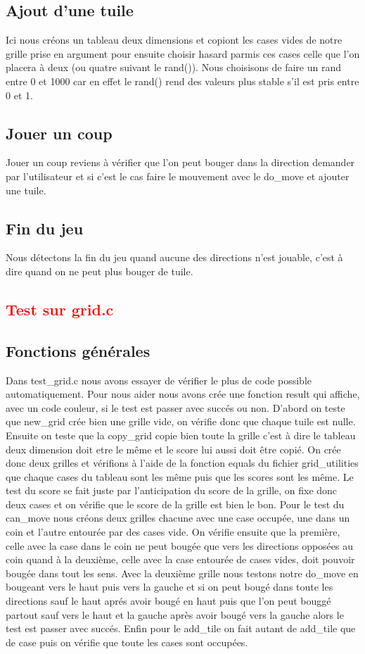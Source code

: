 \documentclass{article}
\begin{document}
\subsection{Ajout d'une tuile}
Ici nous créons un tableau deux dimensions et copiont les cases vides de notre grille prise en argument pour ensuite choisir hasard parmis ces cases celle que l'on placera à deux (ou quatre suivant le rand()). Nous choisisons de faire un rand entre 0 et 1000 car en effet le rand() rend des valeurs plus stable s'il est pris entre 0 et 1.
\subsection{Jouer un coup}
Jouer un coup reviens à vérifier que l'on peut bouger dans la direction demander par l'utilisateur et si c'est le cas faire le mouvement avec le do\_move et ajouter une tuile.
\subsection{Fin du jeu}
Nous détectons la fin du jeu quand aucune des directions n'est jouable, c'est à dire quand on ne peut plus bouger de tuile.
\textcolor{red}{\section{Test sur grid.c}}
\subsection{Fonctions générales}
Dans test\_grid.c nous avons essayer de vérifier le plus de code possible automatiquement.
Pour nous aider nous avons crée une fonction result qui affiche, avec un code couleur, si le test est passer avec succés ou non.
D'abord on teste que new\_grid crée bien une grille vide, on vérifie donc que chaque tuile est nulle.
Ensuite on teste que la copy\_grid copie bien toute la grille c'est à dire le tableau deux dimension doit etre le même et le score lui aussi doit être copié. On crée donc deux grilles et vérifions à l'aide de la fonction equals du fichier grid\_utilities que chaque cases du tableau sont les même puis que les scores sont les même.
Le test du score se fait juste par l'anticipation du score de la grille, on fixe donc deux cases et on vérifie que le score de la grille est bien le bon.
Pour le test du can\_move nous créons deux grilles chacune avec une case occupée, une dans un coin et l'autre entourée par des cases vide. On vérifie ensuite que la première, celle avec la case dans le coin ne peut bougée que vers les directions opposées au coin quand à la deuxième, celle avec la case entourée de cases vides, doit pouvoir bougée dans tout les sens.
Avec la deuxième grille nous testons notre do\_move en bougeant vers le haut puis vers la gauche et si on peut bougé dans toute les directions sauf le haut aprés avoir bougé en haut puis que l'on peut bouggé partout sauf vers le haut et la gauche après avoir bougé vers la gauche alors le test est passer avec succés.
Enfin pour le add\_tile on fait autant de add\_tile que de case puis on vérifie que toute les cases sont occupées.
\end{document}
